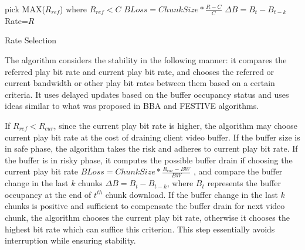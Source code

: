 \begin{algorithm} [t]
\SetAlgoLined
pick MAX($R_{ref}$) where $R_{ref}<C$\;
 {
 {
 $BLoss=ChunkSize*\frac{R-C}{C}$\;
 $\Delta B = B_{t} -B_{t-k} $\;
 {Rate=$R$}
 }
 }
\caption{Rate Selection} \label{cap:algorithm}
\end{algorithm} 

The algorithm considers the stability in the following manner: it
compares the referred play bit rate and current play bit rate, and
chooses the referred or current bandwidth or other play bit rates
between them based on a certain criteria. It uses delayed updates
based on the buffer occupancy status and uses ideas similar to what
was proposed in BBA \cite{BBA} and FESTIVE \cite{Festive} algorithms.

If $R_{ref} < R_{cur}$, since the current play bit rate is higher, the
algorithm may choose current play bit rate at the cost of draining
client video buffer. If the buffer size is in safe phase, the
algorithm takes the risk and adheres to current play bit rate. If the
buffer is in risky phase, it computes the possible buffer drain if
choosing the current play bit rate $BLoss
=ChunkSize*\frac{R_{cur}-BW}{BW}$ 
, and compare the buffer change in
the last $k$ chunks 
$\Delta B = B_{t} -B_{t-k}$, where $B_{t}$
represents the buffer occupancy at the end of $t^{th}$ chunk
download. If the buffer change in the last $k$ chunks is positive and
sufficient to compensate the buffer drain for next video chunk, the
algorithm chooses the current play bit rate, otherwise it chooses the
highest bit rate which can suffice this criterion. This step
essentially avoids interruption while ensuring stability. 


